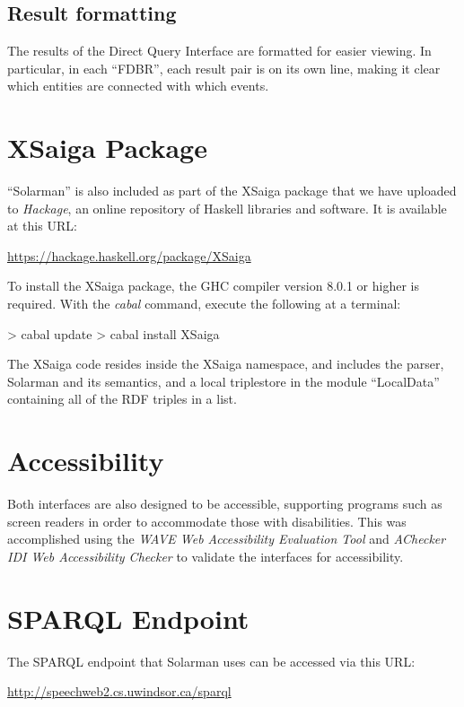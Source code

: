 \documentclass[../main.tex]{subfiles}
\begin{document}
\subsection{Result formatting}

The results of the Direct Query Interface are formatted for easier viewing.  In particular, in each ``FDBR'', each result pair is on its own line, making
it clear which entities are connected with which events.

\section{XSaiga Package}

``Solarman'' is also included as part of the XSaiga package that we have uploaded to {\em Hackage}, an online repository of Haskell libraries and software\cite{XSaiga:2016}.
It is available at this URL:

\url{https://hackage.haskell.org/package/XSaiga}

To install the XSaiga package, the GHC compiler version 8.0.1 or higher is required.  With the {\em cabal} command, execute the following at a terminal:

\begin{code}
	> cabal update
	> cabal install XSaiga
\end{code}

The XSaiga code resides inside the XSaiga namespace, and includes the parser, Solarman and its semantics, and a local triplestore in the module ``LocalData'' containing
all of the RDF triples in a list.  

\section{Accessibility}

Both interfaces are also designed to be accessible, supporting programs such as screen readers in order to accommodate those with disabilities.
This was accomplished using the {\em WAVE Web Accessibility Evaluation Tool}\cite{wave} and {\em AChecker IDI Web Accessibility Checker}\cite{achecker} to validate the interfaces for accessibility.

\section{SPARQL Endpoint}
The SPARQL endpoint that Solarman uses can be accessed via this URL:

\url{http://speechweb2.cs.uwindsor.ca/sparql}
\end{document}
